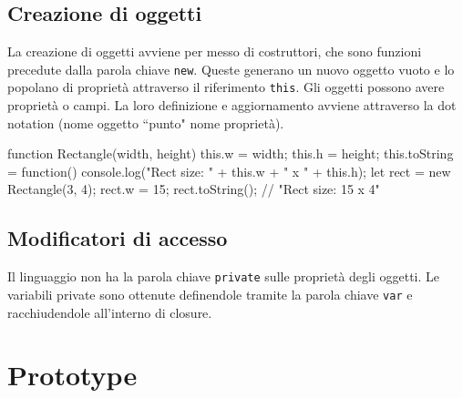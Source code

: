 \subsection{Creazione di oggetti}\label{sec:js:createobj}

La creazione di oggetti avviene per messo di costruttori, che sono funzioni precedute dalla parola chiave \texttt{new}. Queste generano un nuovo oggetto vuoto e lo popolano di proprietà attraverso il riferimento \texttt{this}. Gli oggetti possono avere proprietà o campi. La loro definizione e aggiornamento avviene attraverso la dot notation (nome oggetto ``punto" nome proprietà). 
\begin{javascriptcode}
function Rectangle(width, height) {
    this.w = width;
    this.h = height;
    this.toString = function() { 
        console.log("Rect size: " + this.w + " x " + this.h); 
    }
}
let rect = new Rectangle(3, 4);
rect.w = 15;
rect.toString(); // "Rect size: 15 x 4"
\end{javascriptcode}

\subsection{Modificatori di accesso}

Il linguaggio non ha la parola chiave \texttt{private} sulle proprietà degli oggetti. Le variabili private sono ottenute definendole tramite la parola chiave \texttt{var} e racchiudendole all'interno di closure.

\section{Prototype}

